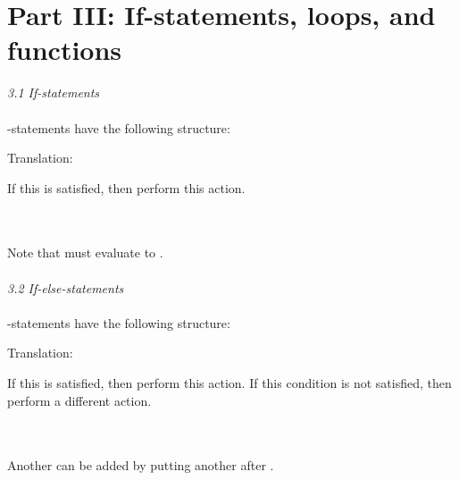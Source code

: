 \label{rhelppartthree}

\section{Part III: If-statements, loops, and functions}

\textit{3.1 If-statements} \\
\\
-statements have the following structure: \\


\begin{minipage}[t]{0.2\textwidth}
Translation:
\end{minipage}
\begin{minipage}[t]{0.8\textwidth}
If this  is satisfied, then perform this action.
\end{minipage} \\
\\
Note that  must evaluate to . \\
\\ 
\textit{3.2 If-else-statements} \\
\\
-statements have the following structure: \\


\begin{minipage}[t]{0.2\textwidth}
Translation:
\end{minipage}
\begin{minipage}[t]{0.8\textwidth}
If this  is satisfied, then perform this action. If this condition is not satisfied, then perform a different action.
\end{minipage} \\
\\
Another  can be added by putting another  after . \\

